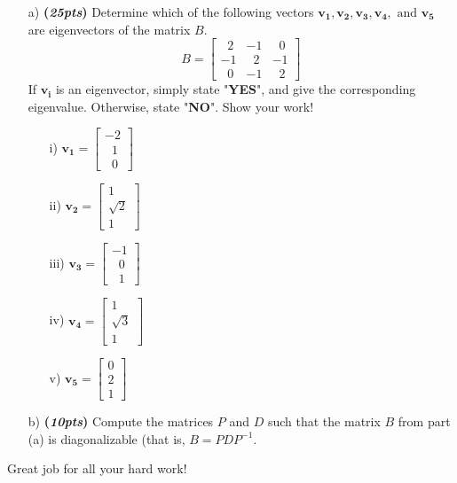 \documentclass[12pt]{article}%
\begin{document}
\begin{enumerate}
\begin{itemize}
    \item[a)] \textbf{(\emph{25pts})} Determine which of the following vectors \(\mathbf{v_1}, \mathbf{v_2}, \mathbf{v_3}, \mathbf{v_4},\text{ and } \mathbf{v_5}\) are eigenvectors of the matrix \(B\).
        \[B = \begin{bmatrix} \;\;2 & -1 & \;\;0 \\ -1 & \;\;2 & -1 \\\;\; 0 & -1 & \;\;2 \end{bmatrix}\]
    If \(\mathbf{v_i}\) is an eigenvector, simply state "\textbf{YES}", and give the corresponding eigenvalue.
    Otherwise, state "\textbf{NO}". Show your work!
    \begin{itemize}
        \item[i)] \(\mathbf{v_1}=\begin{bmatrix}-2\\ \;\;1\\\;\;0\end{bmatrix}\)
        \vspace{3cm}
        \item [ii)] \(\mathbf{v_2}=\begin{bmatrix}1\\ \sqrt{2}\\1\end{bmatrix}\)
        \vspace{3cm}
        \item[iii)]  \(\mathbf{v_3}=\begin{bmatrix}-1\\ \;\;0\\ \;\;1\end{bmatrix}\)
        \vspace{3cm}
        \item [iv)] \(\mathbf{v_4}=\begin{bmatrix}1\\ \sqrt{3}\\1\end{bmatrix}\)
        \vspace{3cm}
        \item [v)] \(\mathbf{v_5}=\begin{bmatrix}0\\ 2\\1\end{bmatrix}\)
    \end{itemize}

    
    
    \vspace{5cm}
    
    \item[b)] \textbf{(\emph{10pts})} Compute the matrices \(P\) and \(D\) such that the matrix \(B\) from part (a) is diagonalizable (that is, \(B=PDP^{-1}\).
    \end{itemize}
\end{enumerate}

\vspace{20cm}

\begin{center}
    Great job for all your hard work!
\end{center}
\end{document}
